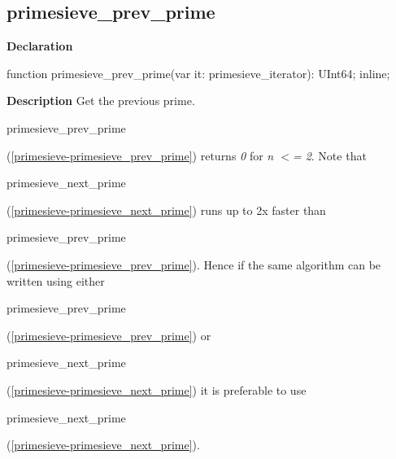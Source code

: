 \documentclass{report}
\newif\ifpdf
\begin{document}
\subsection*{primesieve{\_}prev{\_}prime}
\fi
\label{primesieve-primesieve_prev_prime}
\begin{list}{}{
\setlength{\itemindent}{0cm}
\setlength{\listparindent}{0cm}
\setlength{\leftmargin}{\evensidemargin}
\addtolength{\leftmargin}{\tmplength}
\settowidth{\labelsep}{X}
\addtolength{\leftmargin}{\labelsep}
\setlength{\labelwidth}{\tmplength}
}
\item[\textbf{Declaration}\hfill]
\ifpdf
\begin{flushleft}
\fi
\begin{ttfamily}
function primesieve{\_}prev{\_}prime(var it: primesieve{\_}iterator): UInt64; inline;\end{ttfamily}

\ifpdf
\end{flushleft}
\fi

\par
\item[\textbf{Description}]
Get the previous prime.

\begin{ttfamily}primesieve{\_}prev{\_}prime\end{ttfamily}(\ref{primesieve-primesieve_prev_prime}) returns \textit{0} for \textit{n {$<$}= 2}. Note that \begin{ttfamily}primesieve{\_}next{\_}prime\end{ttfamily}(\ref{primesieve-primesieve_next_prime}) runs up to 2x faster than \begin{ttfamily}primesieve{\_}prev{\_}prime\end{ttfamily}(\ref{primesieve-primesieve_prev_prime}). Hence if the same algorithm can be written using either \begin{ttfamily}primesieve{\_}prev{\_}prime\end{ttfamily}(\ref{primesieve-primesieve_prev_prime}) or \begin{ttfamily}primesieve{\_}next{\_}prime\end{ttfamily}(\ref{primesieve-primesieve_next_prime}) it is preferable to use \begin{ttfamily}primesieve{\_}next{\_}prime\end{ttfamily}(\ref{primesieve-primesieve_next_prime}).

\end{list}
\end{document}
